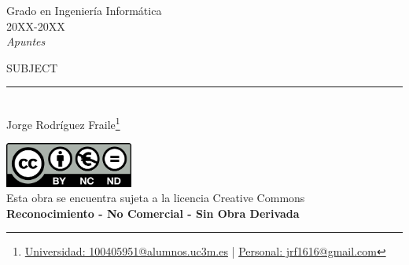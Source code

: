 \documentclass[12pt]{report} %
\begin{document}
	
\begin{titlepage}
	\begin{sffamily}
	\color{azulUC3M}
	\begin{center}
		\begin{figure}[H] %
		\end{figure}
		\vspace{2.5cm}
		\begin{Large}
			Grado en Ingeniería Informática\\			
			20XX-20XX\\
			\vspace{2cm}		
			\textsl{Apuntes}\\
			\bigskip
		\end{Large}
		 	{\Huge SUBJECT}\\
		 	\vspace*{0.5cm}
	 		\rule{10.5cm}{0.1mm}\\
			\vspace*{0.9cm}
			{\LARGE Jorge Rodríguez Fraile\footnote{\href{mailto:100405951@alumnos.uc3m.es}{Universidad: 100405951@alumnos.uc3m.es}  |  \href{mailto:jrf1616@gmail.com}{Personal: jrf1616@gmail.com}}}\\ 
			\vspace*{1cm}
	\end{center}
	\vfill
	\color{black}
		\includegraphics[width=4.2cm]{img/creativecommons.png}\\
		Esta obra se encuentra sujeta a la licencia Creative Commons\\ \textbf{Reconocimiento - No Comercial - Sin Obra Derivada}
	\end{sffamily}
\end{titlepage}


\tableofcontents
\thispagestyle{fancy}
\end{document}
